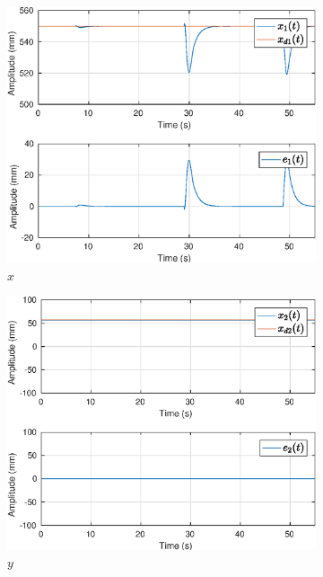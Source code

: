 \begin{figure}[H]
\centering
\begin{subfigure}{.5\textwidth}
  \centering
  \includegraphics[width=\linewidth]{./img/position2/x1.eps}
  \caption{$x$}
  \label{fig:oper_space_exp2_x1}
\end{subfigure}%
\begin{subfigure}{.5\textwidth}
  \centering
  \includegraphics[width=\linewidth]{./img/position2/x2.eps}
  \caption{$y$}
  \label{fig:oper_space_exp2_x2}
\end{subfigure}
\begin{subfigure}{.5\textwidth}

\end{subfigure}
\end{figure}
